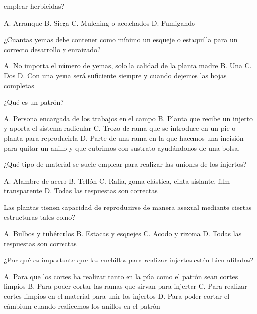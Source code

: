 \documentclass[11pt]{exam}
\begin{document}
{\begin{questions}
  emplear herbicidas?
  \begin{checkboxes}
    \choice A. Arranque
    \choice B. Siega
    \CorrectChoice C. Mulching o acolchados
    \choice D. Fumigando
  \end{checkboxes}
  \question ¿Cuantas yemas debe contener como mínimo un esqueje o estaquilla para un correcto
  desarrollo y enraizado?
  \begin{checkboxes}
    \choice A. No importa el número de yemas, solo la calidad de la planta madre
    \choice B. Una
    \CorrectChoice C. Dos
    \choice D. Con una yema será suficiente siempre y cuando dejemos las hojas completas
  \end{checkboxes}
  \question ¿Qué es un patrón?
  \begin{checkboxes}
  \choice A. Persona encargada de los trabajos en el campo
  \CorrectChoice  B. Planta que recibe un injerto y aporta el sistema radicular
  \choice C. Trozo de rama que se introduce en un pie o planta para reproducirla
  \choice D. Parte de una rama en la que hacemos una incisión para quitar un
  anillo y que cubrimos con sustrato ayudándonos de una bolsa.
  \end{checkboxes}
  \question ¿Qué tipo de material se suele emplear para realizar las uniones de los
  injertos?
  \begin{checkboxes}
    \choice A. Alambre de acero
    \choice B. Teflón
    \CorrectChoice C. Rafia, goma elástica, cinta aislante, film transparente
    \choice D. Todas las respuestas son correctas 
  \end{checkboxes}
  \question Las plantas tienen capacidad de reproducirse de manera asexual mediante
  ciertas estructuras tales como?
  \begin{checkboxes}
    \CorrectChoice A. Bulbos y tubérculos
    \choice B. Estacas y esquejes
    \choice C. Acodo y rizoma
    \choice D. Todas las respuestas son correctas 
  \end{checkboxes}
  \question ¿Por qué es importante que los cuchillos para realizar injertos estén bien
  afilados?
  \begin{checkboxes}
    \CorrectChoice A. Para que los cortes ha realizar tanto en la púa como el patrón sean
    cortes limpios
    \choice B. Para poder cortar las ramas que sirvan para injertar
    \choice C. Para realizar cortes limpios en el material para unir los injertos
    \choice D. Para poder cortar el cámbium  cuando realicemos los anillos en el patrón
  \end{checkboxes}
\end{questions}
}
\end{document}
